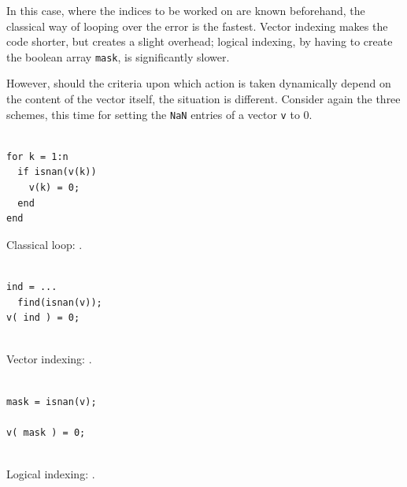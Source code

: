 In this case, where the indices to be worked on are known beforehand, the classical way of looping over the error is the fastest. Vector indexing makes the code shorter, but creates a slight overhead; logical indexing, by having to create the boolean array \lstinline!mask!, is significantly slower.




However, should the criteria upon which action is taken dynamically depend on the content of the vector itself, the situation is different.
Consider again the three schemes, this time for setting the \lstinline!NaN! entries of a vector \lstinline!v! to $0$.

\hfill
\begin{minipage}[t]{.29\textwidth}
\begin{lstlisting}[framerule=1pt,rulecolor=\color{badred}]
% [...] create v

for k = 1:n
  if isnan(v(k))
    v(k) = 0;
  end
end
\end{lstlisting}
Classical loop: .
\end{minipage}
\hfill
\begin{minipage}[t]{.29\textwidth}
\begin{lstlisting}[framerule=1pt,rulecolor=\color{mediocre}]
% [...] create v

ind = ...
  find(isnan(v));
v( ind ) = 0;


\end{lstlisting}
Vector indexing: .
\end{minipage}
\hfill
\begin{minipage}[t]{.29\textwidth}
\begin{lstlisting}[framerule=1pt,rulecolor=\color{goodgreen}]
% [...] create v

mask = isnan(v);

v( mask ) = 0;


\end{lstlisting}
Logical indexing: .
\end{minipage}
\hfill

